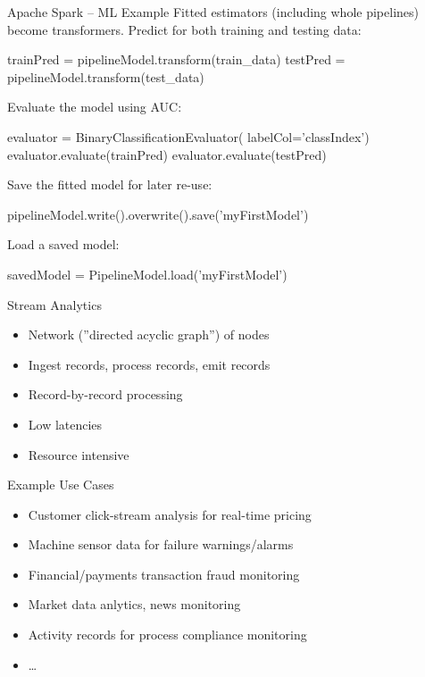 \documentclass[ignorenonframetext,xcolor=x11names]{beamer}
\begin{document}
\begin{frame}[fragile]{Apache Spark -- ML Example}
Fitted estimators (including whole pipelines) become transformers. Predict for both training and testing data:
\begin{pythoncode}
trainPred = pipelineModel.transform(train_data)
testPred = pipelineModel.transform(test_data)
\end{pythoncode}
Evaluate the model using AUC:
\begin{pythoncode}
evaluator = BinaryClassificationEvaluator(
    labelCol='classIndex')
evaluator.evaluate(trainPred)
evaluator.evaluate(testPred)
\end{pythoncode}
Save the fitted model for later re-use:
\begin{pythoncode}
pipelineModel.write().overwrite().save('myFirstModel')
\end{pythoncode}
Load a saved model:
\begin{pythoncode}
savedModel = PipelineModel.load('myFirstModel')
\end{pythoncode}
\end{frame}


\begin{frame}{Stream Analytics}
\begin{itemize}
    \item Network (''directed acyclic graph'') of nodes
    \item Ingest records, process records, emit records
    \item Record-by-record processing
    \item Low latencies
    \item Resource intensive
\end{itemize}
\begin{block}{Example Use Cases}
\begin{itemize}
   \item Customer click-stream analysis for real-time pricing
   \item Machine sensor data for failure warnings/alarms
   \item Financial/payments transaction fraud monitoring
   \item Market data anlytics, news monitoring
   \item Activity records for process compliance monitoring
   \item \ldots
\end{itemize}
\end{block}

\end{frame}
\end{document}
